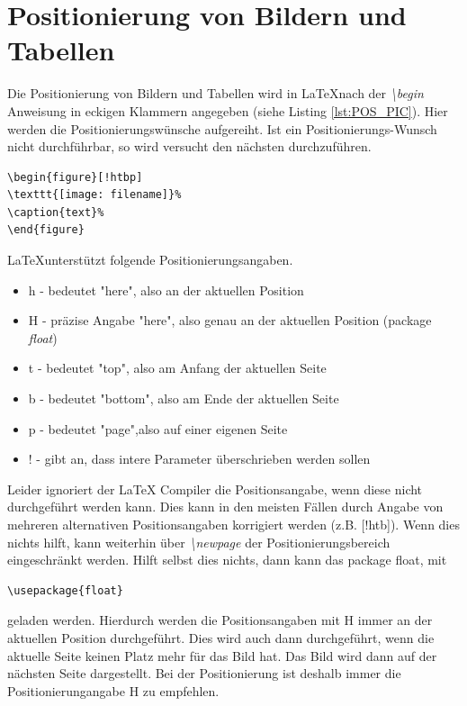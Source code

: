 \documentclass[TGAI_Laborbericht.tex]{subfiles}
\begin{document}
\section{Positionierung von Bildern und Tabellen}
Die Positionierung von Bildern und Tabellen wird in \LaTeX nach der \textit{\textbackslash begin} Anweisung in eckigen Klammern angegeben (siehe Listing \ref{lst:POS_PIC}). Hier werden die Positionierungswünsche aufgereiht. Ist ein Positionierungs-Wunsch nicht durchführbar, so wird versucht den nächsten durchzuführen.

\begin{lstlisting}[style=LATEX, frame=single, caption=Positionierung von Bildern , captionpos=b, label=lst:POS_PIC]
\begin{figure}[!htbp]
\texttt{[image: filename]}%
\caption{text}%
\end{figure}
\end{lstlisting}

\LaTeX unterstützt folgende Positionierungsangaben.
\begin{itemize}
	\item h -  bedeutet "here", also an der aktuellen Position
	\item H -  präzise Angabe "here", also genau an der aktuellen Position (package \textit{float})
	\item t -  bedeutet "top", also am Anfang der aktuellen Seite
	\item b -  bedeutet "bottom", also am Ende der aktuellen Seite
	\item p -  bedeutet "page",also auf einer eigenen Seite
	\item ! -  gibt an, dass intere Parameter überschrieben werden sollen
\end{itemize}

Leider ignoriert der LaTeX Compiler die Positionsangabe, wenn diese nicht durchgeführt werden kann. Dies kann in den meisten Fällen durch Angabe von mehreren alternativen Positionsangaben korrigiert werden (z.B. [!htb]). Wenn dies nichts hilft, kann weiterhin über \textit{\textbackslash newpage}  der Positionierungsbereich eingeschränkt werden. Hilft selbst dies nichts, dann kann das package float, mit
\begin{lstlisting}[style=LATEX]
\usepackage{float}
\end{lstlisting}
geladen werden. Hierdurch werden die Positionsangaben mit H immer an der aktuellen Position durchgeführt. Dies wird auch dann durchgeführt, wenn die aktuelle Seite keinen Platz mehr für das Bild hat. Das Bild wird dann auf der nächsten Seite dargestellt. Bei der Positionierung ist deshalb immer die Positionierungangabe H zu empfehlen.
\end{document}
